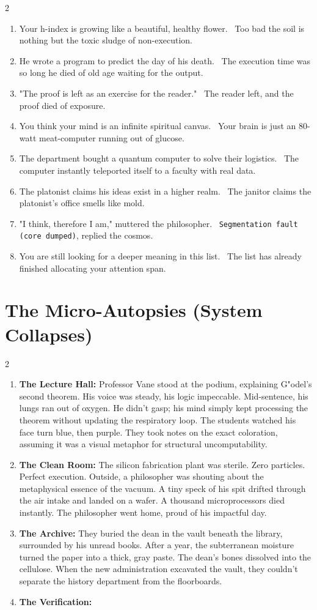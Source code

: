 \documentclass[12pt,a4paper]{article}
\begin{document}
\begin{multicols}{2}
\begin{enumerate}
that truth is a social construct. \ The brick wall he walked into disagreed with a blunt, physical impact.\item Your h-index is growing like a beautiful, healthy flower. \ Too bad the soil is nothing but the toxic sludge of non-execution.\item He wrote a program to predict the day of his death. \ The execution time was so long he died of old age waiting for the output.\item "The proof is left as an exercise for the reader." \ The reader left, and the proof died of exposure.\item You think your mind is an infinite spiritual canvas. \ Your brain is just an 80-watt meat-computer running out of glucose.\item The department bought a quantum computer to solve their logistics. \ The computer instantly teleported itself to a faculty with real data.\item The platonist claims his ideas exist in a higher realm. \ The janitor claims the platonist's office smells like mold.\item "I think, therefore I am," muttered the philosopher. \ \texttt{Segmentation fault (core dumped)}, replied the cosmos.\item You are still looking for a deeper meaning in this list. \ The list has already finished allocating your attention span.\end{enumerate}\end{multicols}\section{The Micro-Autopsies (System Collapses)}\begin{multicols}{2}\begin{enumerate}\item \textbf{The Lecture Hall:} Professor Vane stood at the podium, explaining G"odel's second theorem. His voice was steady, his logic impeccable. Mid-sentence, his lungs ran out of oxygen. He didn't gasp; his mind simply kept processing the theorem without updating the respiratory loop. The students watched his face turn blue, then purple. They took notes on the exact coloration, assuming it was a visual metaphor for structural uncomputability.\item \textbf{The Clean Room:} The silicon fabrication plant was sterile. Zero particles. Perfect execution. Outside, a philosopher was shouting about the metaphysical essence of the vacuum. A tiny speck of his spit drifted through the air intake and landed on a wafer. A thousand microprocessors died instantly. The philosopher went home, proud of his impactful day.\item \textbf{The Archive:} They buried the dean in the vault beneath the library, surrounded by his unread books. After a year, the subterranean moisture turned the paper into a thick, gray paste. The dean's bones dissolved into the cellulose. When the new administration excavated the vault, they couldn't separate the history department from the floorboards.\item \textbf{The Verification:} 
\end{enumerate}
\end{multicols}
\end{document}
